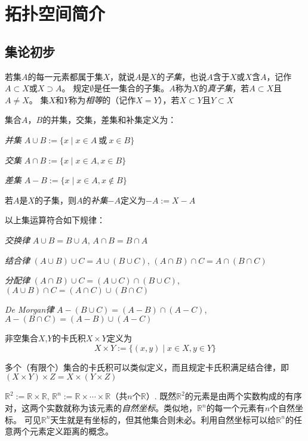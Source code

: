 \chapter{拓扑空间简介}
\section{集论初步}

\begin{definition}
若集$A$的每一元素都属于集$X$，就说$A$是$X$的\emph{子集}，也说$A$含于$X$或$X$含$A$，记作$A \subset X$或$X \supset A$。
规定$\emptyset$是任一集合的子集。$A$称为$X$的\emph{真子集}，若$A \subset X$且$A \neq X$。
集$X$和$Y$称为\emph{相等}的（记作$X = Y$），若$X \subset Y$且$Y \subset X$
\end{definition}

\begin{definition}
集合$A$，$B$的并集，交集，差集和补集定义为：

\emph{并集} $A \cup B := \{x \mid x \in A ~ \text{或} ~ x \in B\}$

\emph{交集} $A \cap B := \{x \mid x \in A, x \in B\}$

\emph{差集} $A - B := \{x \mid x \in A, x \notin B\}$

若$A$是$X$的子集，则$A$的\emph{补集}$-A$定义为$-A := X - A$

\end{definition}

\begin{theorem}
以上集运算符合如下规律：

\emph{交换律} $A \cup B = B \cup A$, $A \cap B = B \cap A$

\emph{结合律} $(A \cup B) \cup C = A \cup (B \cup C)$, $(A \cap B) \cap C = A \cap (B \cap C)$

\emph{分配律} $(A \cap B) \cup C = (A \cup C) \cap (B \cup C)$, $(A \cup B) \cap C = (A \cap C) \cup (B \cap C)$

\emph{De Morgan律} $A - (B \cup C) = (A - B) \cap (A - C)$, $A - (B \cap C) = (A - B) \cup (A - C)$

\end{theorem}

\begin{definition}
非空集合$X$,$Y$的卡氏积$X \times Y$定义为
$$X \times Y := \{(x, y) \mid x \in X, y \in Y\}$$
\end{definition}
多个（有限个）集合的卡氏积可以类似定义，而且规定卡氏积满足结合律，即$(X \times Y) \times Z = X \times (Y \times Z)$

\begin{example}
$\mathbb{R}^2 := \mathbb{R} \times \mathbb{R}$, $\mathbb{R}^n := \mathbb{R} \times \cdots \times \mathbb{R}$（共$n$个$\mathbb{R}$）.
既然$\mathbb{R}^2$的元素是由两个实数构成的有序对，这两个实数就称为该元素的\emph{自然坐标}。类似地，$\mathbb{R}^n$的每一个元素有$n$个自然坐标。
可见$\mathbb{R}^n$天生就是有坐标的，但其他集合则未必。利用自然坐标可以给$\mathbb{R}^n$的任意两个元素定义距离的概念。
\end{example}

